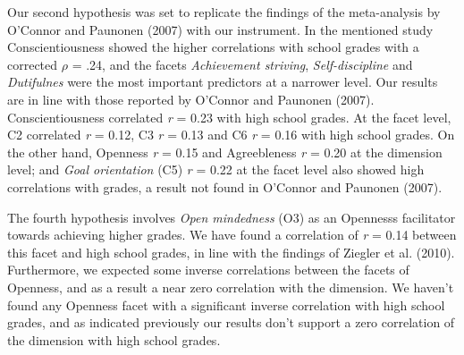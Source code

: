 \documentclass[,man,floatsintext]{apa6}
\begin{document}
Our second hypothesis was set to replicate the findings of the
meta-analysis by O'Connor and Paunonen (2007) with our instrument. In
the mentioned study Conscientiousness showed the higher correlations
with school grades with a corrected \(\rho\) = .24, and the facets
\emph{Achievement striving}, \emph{Self-discipline} and
\emph{Dutifulnes} were the most important predictors at a narrower
level. Our results are in line with those reported by O'Connor and
Paunonen (2007). Conscientiousness correlated \emph{r} = 0.23 with high
school grades. At the facet level, C2 correlated \emph{r} = 0.12, C3
\emph{r} = 0.13 and C6 \emph{r} = 0.16 with high school grades. On the
other hand, Openness \emph{r} = 0.15 and Agreebleness \emph{r} = 0.20 at
the dimension level; and \emph{Goal orientation} (C5) \emph{r} = 0.22 at
the facet level also showed high correlations with grades, a result not
found in O'Connor and Paunonen (2007).

The fourth hypothesis involves \emph{Open mindedness} (O3) as an
Opennesss facilitator towards achieving higher grades. We have found a
correlation of \emph{r} = 0.14 between this facet and high school
grades, in line with the findings of Ziegler et al. (2010). Furthermore,
we expected some inverse correlations between the facets of Openness,
and as a result a near zero correlation with the dimension. We haven't
found any Openness facet with a significant inverse correlation with
high school grades, and as indicated previously our results don't
support a zero correlation of the dimension with high school grades.
\end{document}

